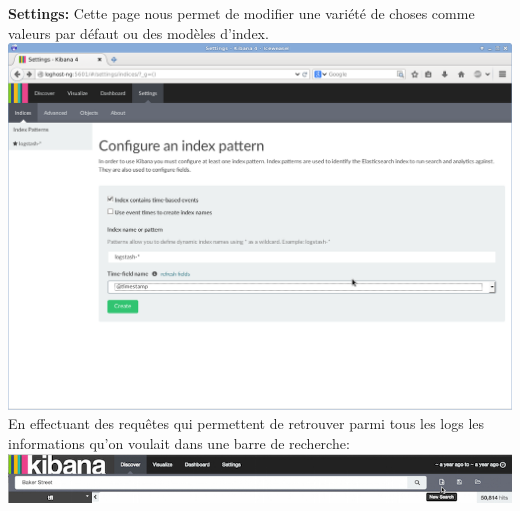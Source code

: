 \documentclass[11pt,a4paper]{article}
\begin{document}
\textbf{Settings:} Cette page nous permet de modifier une variété de choses comme valeurs par défaut ou des modèles d'index.\\

\includegraphics[scale=0.3]{settings.png} \\

En effectuant des requêtes qui permettent de retrouver parmi tous les logs les
informations qu'on voulait dans une barre de recherche:\\

\includegraphics[scale=0.5]{Discover-New-Search.png} \\

\newpage
\end{document}
